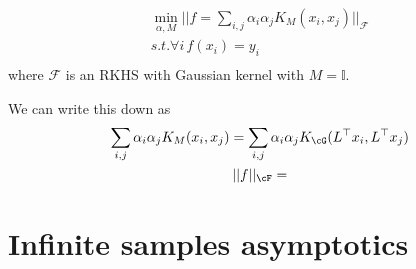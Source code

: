     \begin{gather*}
        \min_{\alpha, M} ||f = \sum_{i,j} \alpha_i \alpha_j K_M(x_i,x_j)||_{\mathcal{F}}\\
        s.t.\forall i\,  f(x_i) = y_i\\
    \end{gather*}
    where $\mathcal{F}$ is an RKHS with Gaussian kernel with $M = \mathbb{I}$.

    We can write this down as 
    \begin{gather*}
        \sum_{i,j} \alpha_i \alpha_j K_M(x_i,x_j) = \sum_{i,j} \alpha_i \alpha_j K_{\cG}(L^{\top}x_i, L^{\top}x_j)\\
        ||f||_{\cF} = 
    \end{gather*}
    \fi

  
\section{Infinite samples asymptotics}


